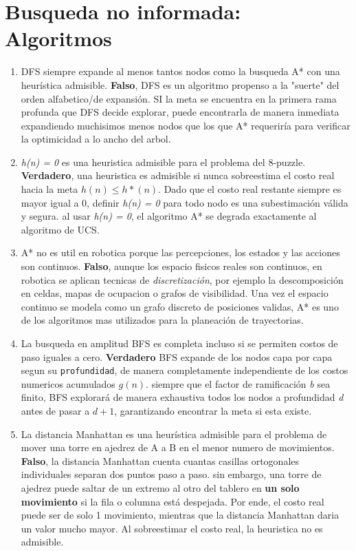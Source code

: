 \section{Busqueda no informada: Algoritmos}

\begin{enumerate}
	\item DFS siempre expande al menos tantos nodos como la busqueda A* con una heurística admisible. \textbf{Falso}, DFS es un algoritmo propenso a la "suerte" del orden alfabetico/de expansión. SI la meta se encuentra en la primera rama profunda que DFS decide explorar, puede encontrarla de manera inmediata expandiendo muchisimos menos nodos que los que A* requeriría para verificar la optimicidad a lo ancho del arbol.
	\item \textit{h(n) = 0} es una heuristica admisible para el problema del 8-puzzle. \textbf{Verdadero}, una heuristica es admisible si nunca sobreestima el costo real hacia la meta $h(n) \leq h*(n)$. Dado que el costo real restante siempre es mayor igual a 0, definir \textit{h(n) = 0} para todo nodo es una subestimación válida y segura. al usar \textit{h(n) = 0}, el algoritmo A* se degrada exactamente al algoritmo de UCS.
	\item A* no es util en robotica porque las percepciones, los estados y las acciones son continuos. \textbf{Falso}, aunque los espacio fisicos reales son continuos, en robotica se aplican tecnicas de \textit{discretización}, por ejemplo la descomposición en celdas, mapas de ocupacion o grafos de visibilidad. Una vez el espacio continuo se modela como un grafo discreto de posiciones validas, A* es uno de los algoritmos mas utilizados para la planeación de trayectorias.
	\item La busqueda en amplitud BFS es completa incluso si se permiten costos de paso iguales a cero. \textbf{Verdadero} BFS expande de los nodos capa por capa segun su \texttt{profundidad}, de manera completamente independiente de los costos numericos acumulados $g(n)$. siempre que el factor de ramificación \textit{b} sea finito, BFS explorará de manera exhaustiva todos los nodos a profundidad \textit{d} antes de pasar a $d + 1$, garantizando encontrar la meta si esta existe.
	\item La distancia Manhattan es una heurística admisible para el problema de mover una torre en ajedrez de A a B en el menor numero de movimientos. \textbf{Falso}, la distancia Manhattan cuenta cuantas casillas ortogonales individuales separan dos puntos paso a paso. sin embargo, una torre de ajedrez puede saltar de un extremo al otro del tablero en \textbf{un solo movimiento} si la fila o columna está despejada. Por ende, el costo real puede ser de solo 1 movimiento, mientras que la distancia Manhattan daria un valor mucho mayor. Al sobreestimar el costo real, la heuristica no es admisible.
\end{enumerate}


